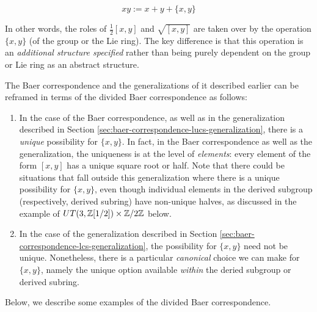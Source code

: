 $$xy := x + y + \{ x, y \}$$

In other words, the roles of $\frac{1}{2}[x,y]$ and $\sqrt{[x,y]}$ are
taken over by the operation $\{x, y\}$ (of the group or the Lie
ring). The key difference is that this operation is an {\em additional
  structure specified} rather than being purely dependent on the group
or Lie ring as an abstract structure. 

The Baer correspondence and the generalizations of it described
earlier can be reframed in terms of the divided Baer correspondence as
follows:

\begin{enumerate}
\item In the case of the Baer correspondence, as well as in the
  generalization described in Section
  \ref{sec:baer-correspondence-lucs-generalization}, there is a {\em
    unique} possibility for $\{ x, y \}$. In fact, in the Baer
  correspondence as well as the generalization, the uniqueness is at
  the level of {\em elements}: every element of the form $[x,y]$ has a
  unique square root or half. Note that there could be situations that
  fall outside this generalization where there is a unique possibility
  for $\{ x,y \}$, even though individual elements in the derived
  subgroup (respectively, derived subring) have non-unique halves, as
  discussed in the example of $UT(3,\mathbb{Z}[1/2]) \times \mathbb{Z}/2\mathbb{Z}$ below.
\item In the case of the generalization described in Section
  \ref{sec:baer-correspondence-lcs-generalization}, the possibility
  for $\{ x, y\}$ need not be unique. Nonetheless, there is a
  particular {\em canonical} choice we can make for $\{ x, y\}$,
  namely the unique option available {\em within} the deried subgroup
  or derived subring.
\end{enumerate}

Below, we describe some examples of the divided Baer correspondence.

